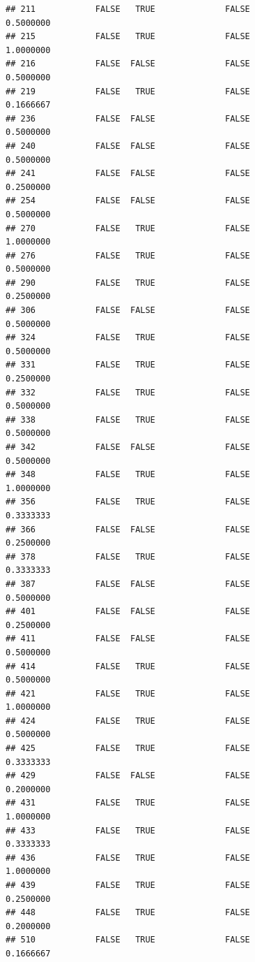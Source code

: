 \documentclass[
]{article}
\begin{document}
\begin{verbatim}
## 211            FALSE   TRUE              FALSE                0.5000000
## 215            FALSE   TRUE              FALSE                1.0000000
## 216            FALSE  FALSE              FALSE                0.5000000
## 219            FALSE   TRUE              FALSE                0.1666667
## 236            FALSE  FALSE              FALSE                0.5000000
## 240            FALSE  FALSE              FALSE                0.5000000
## 241            FALSE  FALSE              FALSE                0.2500000
## 254            FALSE  FALSE              FALSE                0.5000000
## 270            FALSE   TRUE              FALSE                1.0000000
## 276            FALSE   TRUE              FALSE                0.5000000
## 290            FALSE   TRUE              FALSE                0.2500000
## 306            FALSE  FALSE              FALSE                0.5000000
## 324            FALSE   TRUE              FALSE                0.5000000
## 331            FALSE   TRUE              FALSE                0.2500000
## 332            FALSE   TRUE              FALSE                0.5000000
## 338            FALSE   TRUE              FALSE                0.5000000
## 342            FALSE  FALSE              FALSE                0.5000000
## 348            FALSE   TRUE              FALSE                1.0000000
## 356            FALSE   TRUE              FALSE                0.3333333
## 366            FALSE  FALSE              FALSE                0.2500000
## 378            FALSE   TRUE              FALSE                0.3333333
## 387            FALSE  FALSE              FALSE                0.5000000
## 401            FALSE  FALSE              FALSE                0.2500000
## 411            FALSE  FALSE              FALSE                0.5000000
## 414            FALSE   TRUE              FALSE                0.5000000
## 421            FALSE   TRUE              FALSE                1.0000000
## 424            FALSE   TRUE              FALSE                0.5000000
## 425            FALSE   TRUE              FALSE                0.3333333
## 429            FALSE  FALSE              FALSE                0.2000000
## 431            FALSE   TRUE              FALSE                1.0000000
## 433            FALSE   TRUE              FALSE                0.3333333
## 436            FALSE   TRUE              FALSE                1.0000000
## 439            FALSE   TRUE              FALSE                0.2500000
## 448            FALSE   TRUE              FALSE                0.2000000
## 510            FALSE   TRUE              FALSE                0.1666667

\end{verbatim}
\end{document}
